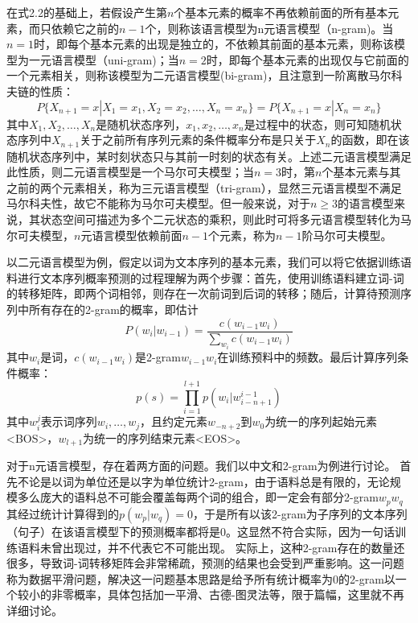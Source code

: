 在式2.2的基础上，若假设产生第$n$个基本元素的概率不再依赖前面的所有基本元素，而只依赖它之前的$n-1$个，则称该语言模型为n元语言模型（n-gram)。当$n=1$时，即每个基本元素的出现是独立的，不依赖其前面的基本元素，则称该模型为一元语言模型（uni-gram)；当$n=2$时，即每个基本元素的出现仅与它前面的一个元素相关，则称该模型为二元语言模型(bi-gram)，且注意到一阶离散马尔科夫链的性质：
\begin{equation}
    P\{X_{n+1} = x|X_1 = x_1, X_2 = x_2, \dots, X_n = x_n\} = P\{X_{n+1} = x| X_n = x_n\}
\end{equation}
其中$X_1, X_2, \dots , X_n$是随机状态序列，$x_1, x_2, \dots, x_n$是过程中的状态，则可知随机状态序列中$X_{n+1}$关于之前所有序列元素的条件概率分布是只关于${X_n}$的函数，即在该随机状态序列中，某时刻状态只与其前一时刻的状态有关。上述二元语言模型满足此性质，则二元语言模型是一个马尔可夫模型；当$n=3$时，第$n$个基本元素与其之前的两个元素相关，称为三元语言模型（tri-gram），显然三元语言模型不满足马尔科夫性，故它不能称为马尔可夫模型。但一般来说，对于$n\geq 3$的语言模型来说，其状态空间可描述为多个二元状态的乘积，则此时可将多元语言模型转化为马尔可夫模型，$n$元语言模型依赖前面$n-1$个元素，称为$n-1$阶马尔可夫模型。

以二元语言模型为例，假定以词为文本序列的基本元素，我们可以将它依据训练语料进行文本序列概率预测的过程理解为两个步骤：首先，使用训练语料建立词-词的转移矩阵，即两个词相邻，则存在一次前词到后词的转移；随后，计算待预测序列中所有存在的2-gram的概率，即估计
\begin{equation}
    P(w_i|w_{i-1}) = \frac{c(w_{i-1}w_i)}{\sum_{w_i}c(w_{i-1}w_i)}
\end{equation}
其中$w_i$是词，$c(w_{i-1}w_i)$是2-gram$w_{i-1}w_i$在训练预料中的频数。最后计算序列条件概率：
\begin{equation}
    p(s) = \prod_{i=1}^{l+1}p(w_i|w^{i-1}_{i-n+1})
\end{equation}
其中$w^j_i$表示词序列$w_i,\dots,w_j$，且约定元素$w_{-n+2}$到$w_0$为统一的序列起始元素<BOS>，$w_{l+1}$为统一的序列结束元素<EOS>。

对于n元语言模型，存在着两方面的问题。我们以中文和2-gram为例进行讨论。
首先不论是以词为单位还是以字为单位统计2-gram，由于语料总是有限的，无论规模多么庞大的语料总不可能会覆盖每两个词的组合，即一定会有部分2-gram$w_p w_q$其经过统计计算得到的$p(w_p|w_q)=0$，于是所有以该2-gram为子序列的文本序列（句子）在该语言模型下的预测概率都将是0。这显然不符合实际，因为一句话训练语料未曾出现过，并不代表它不可能出现。
实际上，这种2-gram存在的数量还很多，导致词-词转移矩阵会非常稀疏，预测的结果也会受到严重影响。这一问题称为数据平滑问题，解决这一问题基本思路是给予所有统计概率为0的2-gram以一个较小的非零概率，具体包括加一平滑、古德-图灵法等，限于篇幅，这里就不再详细讨论。

